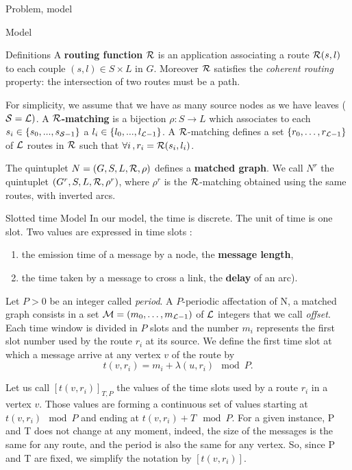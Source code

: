 \documentclass[a4paper,10pt]{report}
\newcommand\rmatching{${\cal R}$-matching\xspace}
\newcommand\matchedgraph{{\bf matched graph}}
\begin{document}
\begin{chapter}{Problem, model}
\begin{section}{Model}
\begin{subsection}{Definitions}
A {\bf routing function}  ${\cal R}$ is an application associating a route  ${\cal R}(s,l)$ to each couple $(s,l) \in S \times L$ in $G$.
Moreover ${\cal R}$ satisfies the \emph{coherent routing} property: the intersection of two routes must be a path.

For simplicity, we assume that we have as many source nodes as we have leaves (${\cal S} = {\cal L})$.
A {\bf ${\cal R}$-matching} is a bijection $\rho :S\rightarrow L$ which associates to each $s_i \in \{s_0,...,s_{{\cal S}-1}\}$ 
a $l_i \in \{l_0,...,l_{{\cal L}-1}\}$.
A \rmatching defines a set $\{r_0, \ldots ,r_{{\cal L}-1}\}$ of ${\cal L}$ routes in ${\cal R}$ such that $\forall i\,, r_i = {\cal R}(s_i,l_i)$.

The quintuplet $N=(G,S,L,{\cal R},\rho)$ defines a \matchedgraph. We call $N^r$ the quintuplet $(G^r,S,L,{\cal R},\rho^r)$, 
where $\rho^r$ is the \rmatching obtained using the same routes, with inverted arcs.

\end{subsection}
\begin{subsection}{Slotted time Model}
In our model, the time is discrete. The unit of time is one slot. Two values are expressed in time slots : 
\begin{enumerate}
 \item the emission time of a message by a node, the {\bf message length},
 \item the time taken by a message to cross a link, the {\bf delay} of an arc).
\end{enumerate}

Let $P>0$ be an integer called {\em period}. 
A $P$-periodic affectation of N, a matched graph consists in a set  ${\cal M}=(m_0, \ldots ,m_{{\cal L}-1})$
of ${\cal L}$ integers that we call \emph{offset}. 
Each time window is divided in $P$ slots and the number $m_i$ represents the first slot number used by the route $r_i$ at its source.
We define the first time slot at which a message arrive at any vertex $v$ of the route by $$t(v,r_i) = m_i+\lambda(u,r_i) \mod P.$$

Let us call $[t(v,r_i)]_{T,P}$ the values of the time slots used by a route $r_i$ in a vertex $v$. 
Those values are forming a continuous set of values starting at $t(v,r_i) \mod P$ and ending at $t(v,r_i) + T \mod P$.
For a given instance, P and T does not change at any moment, indeed, the size of the messages is the same for any route, and the period is also the same for any vertex.
So, since P and T are fixed, we simplify the notation by $[t(v,r_i)]$.


\end{subsection}
\end{section}
\end{chapter}
\end{document}
